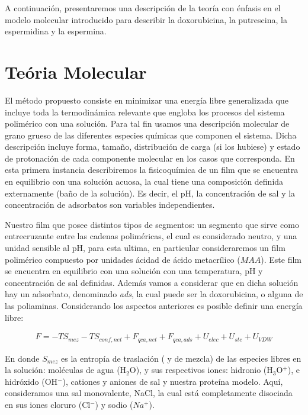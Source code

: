 A continuaci\'on, presentaremos una descripci\'on de la teor\'ia con \'enfasis en el modelo molecular introducido para describir la doxorubicina, la putrescina, la espermidina y la espermina.


\section{Te\'oria Molecular } \label{sec:film-teoria}

El m\'etodo propuesto consiste en minimizar una energ\'ia libre generalizada que incluye toda la termodin\'amica relevante que engloba los procesos del sistema polim\'erico con una soluci\'on.
Para tal fin  usamos  una descripci\'on molecular de grano grueso de las diferentes especies qu\'imicas que componen el sistema.
Dicha descripci\'on incluye forma, tama\~no, distribuci\'on de carga (si los hubiese) y estado de protonaci\'on de cada componente molecular en los casos que corresponda.
En esta primera instancia describiremos la fisicoqu\'imica de un film  que  se encuentra en  equilibrio con una soluci\'on acuosa, la cual  tiene una composici\'on  definida externamente (ba\~no de la soluci\'on).
Es decir, el pH, la concentración de sal y la concentraci\'on de adsorbatos son variables independientes.


Nuestro film que posee distintos tipos de segmentos: un segmento que sirve como entrecruzante entre las cadenas polim\'ericas, el cual es considerado neutro, y  una unidad sensible al pH,  para esta ultima, en particular consideraremos un film polim\'erico compuesto por unidades \'acidad de \'acido metacr\'ilico ($MAA$).
Este film  se encuentra en equilibrio con una soluci\'on con una temperatura, pH y concentraci\'on de sal definidas. Adem\'as vamos a considerar que en dicha soluci\'on hay un adsorbato, denominado \textit{ads}, la cual puede ser la doxorubicina, o alguna de las poliaminas.
Considerando los aspectos anteriores es posible definir una energ\'ia libre:

\begin{align}
 	F = -TS_{mez} -TS_{conf,net} + F_{qca,net} + F_{qca,ads} + U_{elec} + U_{ste} + U_{VDW}
 	\label{eq:film:libre-film}
\end{align}
 
\noindent En donde $S_{mez}$ es la entrop\'ia de traslaci\'on ( y de mezcla) de las especies libres en la soluci\'on: mol\'eculas de agua (H$_2$O), y sus respectivos iones:  hidronio (H$_3$O$^+$), e hidr\'oxido (OH$^- $), cationes y aniones de sal y nuestra prote\'ina modelo.
Aqu\'i, consideramos una sal monovalente, NaCl, la cual est\'a completamente disociada en sus  iones cloruro (Cl$^-$) y sodio ($Na^+$). 

